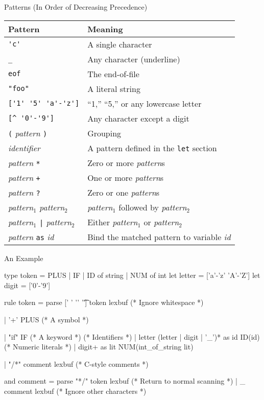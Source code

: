 \documentclass{plt}
\begin{document}
\begin{frame}[fragile]{Patterns (In Order of Decreasing Precedence)}
\footnotesize
\begin{tabular}{ll}
\toprule
\textbf{Pattern} & \textbf{Meaning} \\
\midrule
\verb|'c'| & A single character\\
\verb|_| & Any character (underline)\\
\verb|eof| & The end-of-file\\
\verb|"foo"| & A literal string\\
\verb|['1' '5' 'a'-'z']| & ``1,'' ``5,'' or any lowercase letter\\
\verb|[^ '0'-'9']| & Any character except a digit \\
\verb|(| \emph{pattern} \verb|)| & Grouping\\
\emph{identifier} & A pattern defined in the \texttt{let} section\\
\midrule
\emph{pattern} \verb|*| & Zero or more \emph{pattern}s\\
\emph{pattern} \verb|+| & One or more \emph{pattern}s\\
\midrule
\emph{pattern} \verb|?| & Zero or one \emph{pattern}s\\
\midrule
\emph{pattern}$_1$ \emph{pattern}$_2$  & \emph{pattern}$_1$ followed by \emph{pattern}$_2$\\
\midrule
\emph{pattern}$_1$ \verb+|+ \emph{pattern}$_2$  & Either \emph{pattern}$_1$ or \emph{pattern}$_2$\\
\midrule
\emph{pattern} \verb|as| \emph{id}  & Bind the matched pattern to variable \emph{id}\\
\bottomrule
\end{tabular}

\end{frame}

\begin{frame}[fragile]{An Example}
\small
\begin{ocamllex}
{ type token = PLUS | IF | ID of string | NUM of int }
let letter = ['a'-'z' 'A'-'Z']
let digit = ['0'-'9']

rule token =
 parse [' ' '\n' '\t'] { token lexbuf } (* Ignore whitespace *)

     | '+' { PLUS }                     (* A symbol *)

     | "if" { IF }                      (* A keyword *)
                                        (* Identifiers *)
     | letter (letter | digit | '_')* as id { ID(id) }
                                        (* Numeric literals *)
     | digit+ as lit { NUM(int_of_string lit) }

     | "/*" { comment lexbuf }          (* C-style comments *)

and comment =
  parse "*/" { token lexbuf } (* Return to normal scanning *)
      | _ { comment lexbuf }  (* Ignore other characters *)
\end{ocamllex}

\end{frame}
\end{document}

